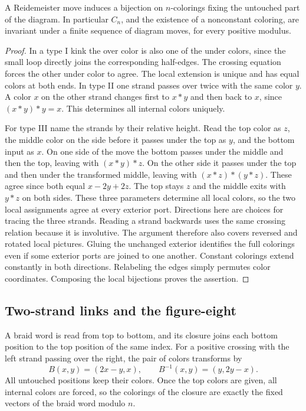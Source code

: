 \begin{theorem}\label{idx-knots20}
A Reidemeister move induces a bijection on $n$-colorings fixing the
untouched part of the diagram. In particular $C_n$, and the existence of
a nonconstant coloring, are invariant under a finite sequence of
diagram moves, for every positive modulus.
\end{theorem}
\begin{proof}
In a type I kink the over color is also one of the under colors,
since the small loop directly joins the corresponding half-edges. The
crossing equation forces the other under color to agree. The local
extension is unique and has equal colors at both ends.
In type II one strand passes over twice with the same color $y$. A
color $x$ on the other strand changes first to $x*y$ and then back to
$x$, since $(x*y)*y=x$. This determines all internal colors uniquely.

For type III name the strands by their relative height. Read the top
color as $z$, the middle color on the side before it passes under the
top as $y$, and the bottom input as $x$. On one side of the move the
bottom passes under the middle and then the top, leaving with
$(x*y)*z$. On the other side it passes under the top and then under
the transformed middle, leaving with $(x*z)*(y*z)$. These agree since
both equal $x-2y+2z$. The top stays $z$ and the middle exits with $y*z$
on both sides. These three parameters determine all local colors, so
the two local assignments agree at every exterior port. Directions here
are choices for tracing the three strands. Reading a strand backwards
uses the same crossing relation because it is involutive. The argument
therefore also covers reversed and rotated local pictures. Gluing the
unchanged exterior identifies the full colorings even if some exterior
ports are joined to one another. Constant colorings extend constantly
in both directions. Relabeling the edges simply permutes color
coordinates. Composing the local bijections proves the assertion.
\end{proof}

\subsection{Two-strand links and the figure-eight}
A braid word is read from top to bottom, and its closure joins each bottom
position to the top position of the same index. For a positive crossing
with the left strand passing over the right, the pair of colors transforms
by
\[
 B(x,y)=(2x-y,x),\qquad B^{-1}(x,y)=(y,2y-x).
\]
All untouched positions keep their colors. Once the top colors are
given, all internal colors are forced, so the colorings of the closure
are exactly the fixed vectors of the braid word modulo $n$.

